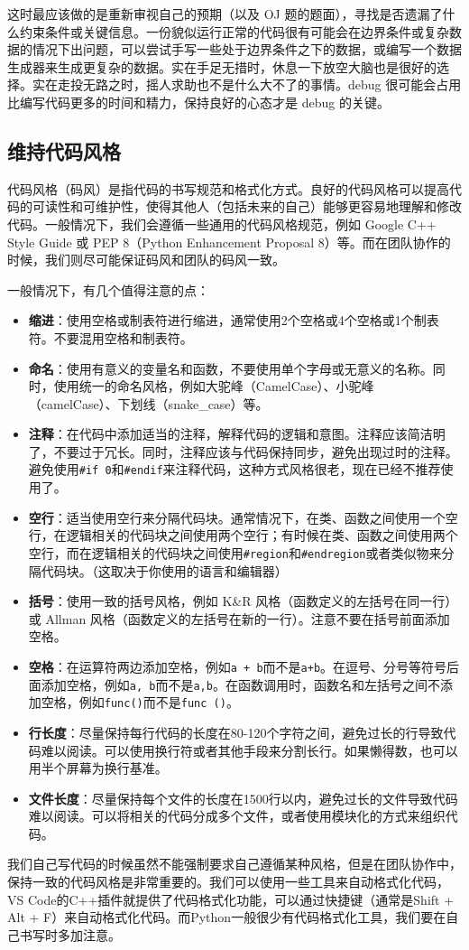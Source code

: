 \documentclass[../main.tex]{subfiles}
\begin{document}
这时最应该做的是重新审视自己的预期（以及 OJ 题的题面），寻找是否遗漏了什么约束条件或关键信息。一份貌似运行正常的代码很有可能会在边界条件或复杂数据的情况下出问题，可以尝试手写一些处于边界条件之下的数据，或编写一个数据生成器来生成更复杂的数据。实在手足无措时，休息一下放空大脑也是很好的选择。实在走投无路之时，摇人求助也不是什么大不了的事情。debug 很可能会占用比编写代码更多的时间和精力，保持良好的心态才是 debug 的关键。

\subsection{维持代码风格}\label{sec:code-style}

代码风格（码风）是指代码的书写规范和格式化方式。良好的代码风格可以提高代码的可读性和可维护性，使得其他人（包括未来的自己）能够更容易地理解和修改代码。一般情况下，我们会遵循一些通用的代码风格规范，例如 Google C++ Style Guide 或 PEP 8（Python Enhancement Proposal 8）等。而在团队协作的时候，我们则尽可能保证码风和团队的码风一致。

一般情况下，有几个值得注意的点：
\begin{itemize}
  \item \textbf{缩进}：使用空格或制表符进行缩进，通常使用2个空格或4个空格或1个制表符。不要混用空格和制表符。
  \item \textbf{命名}：使用有意义的变量名和函数，不要使用单个字母或无意义的名称。同时，使用统一的命名风格，例如大驼峰（CamelCase）、小驼峰（camelCase）、下划线（snake\_case）等。
  \item \textbf{注释}：在代码中添加适当的注释，解释代码的逻辑和意图。注释应该简洁明了，不要过于冗长。同时，注释应该与代码保持同步，避免出现过时的注释。避免使用\texttt{\#if 0}和\texttt{\#endif}来注释代码，这种方式风格很老，现在已经不推荐使用了。
  \item \textbf{空行}：适当使用空行来分隔代码块。通常情况下，在类、函数之间使用一个空行，在逻辑相关的代码块之间使用两个空行；有时候在类、函数之间使用两个空行，而在逻辑相关的代码块之间使用\texttt{\#region}和\texttt{\#endregion}或者类似物来分隔代码块。（这取决于你使用的语言和编辑器）
  \item \textbf{括号}：使用一致的括号风格，例如 K\&R 风格（函数定义的左括号在同一行）或 Allman 风格（函数定义的左括号在新的一行）。注意不要在括号前面添加空格。
  \item \textbf{空格}：在运算符两边添加空格，例如\texttt{a + b}而不是\texttt{a+b}。在逗号、分号等符号后面添加空格，例如\texttt{a, b}而不是\texttt{a,b}。在函数调用时，函数名和左括号之间不添加空格，例如\texttt{func()}而不是\texttt{func ()}。
  \item \textbf{行长度}：尽量保持每行代码的长度在80-120个字符之间，避免过长的行导致代码难以阅读。可以使用换行符或者其他手段来分割长行。如果懒得数，也可以用半个屏幕为换行基准。
  \item \textbf{文件长度}：尽量保持每个文件的长度在1500行以内，避免过长的文件导致代码难以阅读。可以将相关的代码分成多个文件，或者使用模块化的方式来组织代码。
\end{itemize}

我们自己写代码的时候虽然不能强制要求自己遵循某种风格，但是在团队协作中，保持一致的代码风格是非常重要的。我们可以使用一些工具来自动格式化代码，VS Code的C++插件就提供了代码格式化功能，可以通过快捷键（通常是Shift + Alt + F）来自动格式化代码。而Python一般很少有代码格式化工具，我们要在自己书写时多加注意。
\end{document}
